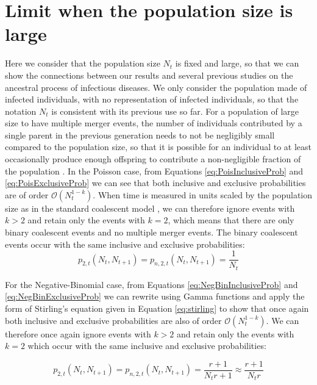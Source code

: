 \documentclass{article}
\renewcommand{\eqref}[1]{\ref{#1}}
\begin{document}
\section{Limit when the population size is large}
 
Here we consider that the population size $N_t$ is fixed and large, so that 
we can show the connections
between our results and several previous studies on the ancestral process of infectious diseases.
We only consider the population made of infected individuals, with no representation of infected individuals, 
so that the notation $N_t$ is consistent with its previous use so far.
For a population of large size to have multiple merger events, the number of individuals
contributed by a single parent in the previous generation needs to not be negligibly small compared
to the population size, so that it is possible for an individual to at least occasionally produce enough 
offspring to contribute a non-negligible fraction of the population \citep{schweinsbergCoalescentProcessesObtained2003,berestyckiRecentProgressCoalescent2009}. 
In the Poisson case, from Equations \eqref{eq:PoisInclusiveProb} and \eqref{eq:PoisExclusiveProb} we can see that both inclusive and exclusive probabilities
are of order $\mathcal{O}(N_t^{1-k})$. When time is measured in units scaled by the population size
as in the standard coalescent model \citep{Kingman1982},
we can therefore ignore events with $k>2$
and retain only the events with $k=2$, which means that there are only binary coalescent events
and no multiple merger events.
The binary coalescent events occur with the same inclusive and exclusive
probabilities:
\begin{equation}
p_{2,t}(N_t, N_{t+1})=p_{n,2,t}(N_t, N_{t+1})=\frac{1}{N_t}\label{eq:poissonapprox}
\end{equation}

For the Negative-Binomial case, from Equations \eqref{eq:NegBinInclusiveProb} and \eqref{eq:NegBinExclusiveProb} we can rewrite using Gamma functions and apply the 
form of Stirling's equation given in Equation \eqref{eq:stirling} to show that 
once again both inclusive and exclusive probabilities are also of order $\mathcal{O}(N_t^{1-k})$. 
We can therefore once again ignore events with $k>2$
and retain only the events with $k=2$ which occur with the same inclusive and 
exclusive probabilities:

\begin{equation}
p_{2,t}(N_t, N_{t+1})=p_{n,2,t}(N_t, N_{t+1})=\frac{r+1}{N_t r +1} \approx \frac{r+1}{N_t r}\label{eq:negbinapprox}
\end{equation}
\end{document}
